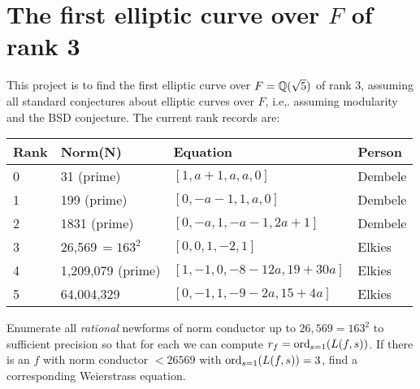 \documentclass{article}
\begin{document}
\section{The first elliptic curve over $F$ of  rank 3}
This project is to find the first elliptic curve over $F=\mathbb{Q}(\sqrt{5})$
of rank 3, assuming all standard conjectures about elliptic curves
over $F$, i.e,. assuming modularity and the BSD conjecture. 
The current rank records are:
\begin{center}
\begin{tabular}{|l|l|l|l|}\hline
Rank & Norm(N) & Equation & Person\\\hline
0 & 31 (prime) &  $[1,a+1,a,a,0]$ &  Dembele \\
1 & 199 (prime) &  $[0,-a-1,1,a,0]$ &  Dembele \\
2 & 1831 (prime) &  $[0,-a,1,-a-1,2a+1]$ & Dembele \\
3 & 26,569$\,=163^2$ &  $[0,0,1,-2,1]$ & Elkies \\
4 & 1,209,079 (prime) & $[1, -1, 0, -8-12a, 19+30a]$ & Elkies \\
5 & 64,004,329 & $[0, -1, 1, -9-2a, 15+4a]$ & Elkies
\\\hline
\end{tabular}
\end{center}

\vspace{1em}
Enumerate all {\em rational} newforms of norm conductor up to
$26,569=163^2$ to sufficient precision so that for each we can compute
$r_f = \operatorname{ord}_{s=1}(L(f,s))$.  If there is an $f$ with norm conductor
$<26569$ with $\operatorname{ord}_{s=1}(L(f,s))=3$, find a corresponding Weierstrass
equation.
\end{document}
